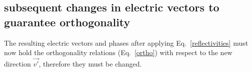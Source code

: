 \documentclass{iucr}
\begin{document}
\subsection{subsequent changes in electric vectors to guarantee orthogonality}
\label{sec:orthogonality}

The resulting electric vectors and phases after applying Eq.~\ref{reflectivities} must now hold the orthogonality relations (Eq.~\ref{ortho}) with respect to the new direction $\vec{v'}$, therefore they must be changed. 



\end{document}
